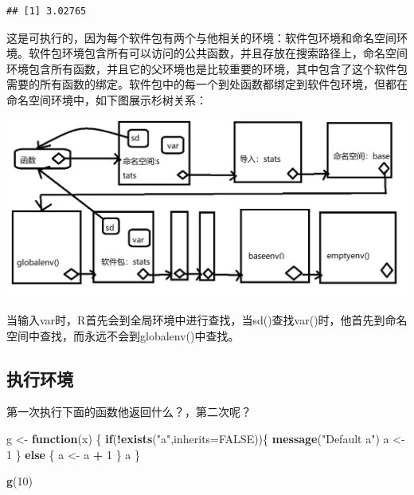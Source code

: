 \documentclass[]{book}
\newenvironment{Shaded}{\begin{snugshade}}{\end{snugshade}}
\newcommand{\KeywordTok}[1]{\textcolor[rgb]{0.13,0.29,0.53}{\textbf{#1}}}
\newcommand{\DataTypeTok}[1]{\textcolor[rgb]{0.13,0.29,0.53}{#1}}
\newcommand{\DecValTok}[1]{\textcolor[rgb]{0.00,0.00,0.81}{#1}}
\newcommand{\StringTok}[1]{\textcolor[rgb]{0.31,0.60,0.02}{#1}}
\newcommand{\OtherTok}[1]{\textcolor[rgb]{0.56,0.35,0.01}{#1}}
\newcommand{\ControlFlowTok}[1]{\textcolor[rgb]{0.13,0.29,0.53}{\textbf{#1}}}
\newcommand{\OperatorTok}[1]{\textcolor[rgb]{0.81,0.36,0.00}{\textbf{#1}}}
\newcommand{\NormalTok}[1]{#1}
\begin{document}
\begin{verbatim}
## [1] 3.02765
\end{verbatim}

这是可执行的，因为每个软件包有两个与他相关的环境：软件包环境和命名空间环境。软件包环境包含所有可以访问的公共函数，并且存放在搜索路径上，命名空间环境包含所有函数，并且它的父环境也是比较重要的环境，其中包含了这个软件包需要的所有函数的绑定。软件包中的每一个到处函数都绑定到软件包环境，但都在命名空间环境中，如下图展示杉树关系：

\begin{center}\includegraphics{img/ch7-9} \end{center}

当输入var时，R首先会到全局环境中进行查找，当sd()查找var()时，他首先到命名空间中查找，而永远不会到globalenv()中查找。

\subsection{执行环境}

第一次执行下面的函数他返回什么？，第二次呢？

\begin{Shaded}
\begin{Highlighting}[]
\NormalTok{g <-}\StringTok{ }\ControlFlowTok{function}\NormalTok{(x) \{}
  \ControlFlowTok{if}\NormalTok{(}\OperatorTok{!}\KeywordTok{exists}\NormalTok{(}\StringTok{"a"}\NormalTok{,}\DataTypeTok{inherits=}\OtherTok{FALSE}\NormalTok{))\{}
    \KeywordTok{message}\NormalTok{(}\StringTok{"Default a"}\NormalTok{)}
\NormalTok{    a <-}\StringTok{ }\DecValTok{1}
\NormalTok{  \} }\ControlFlowTok{else}\NormalTok{ \{}
\NormalTok{    a <-}\StringTok{ }\NormalTok{a }\OperatorTok{+}\StringTok{ }\DecValTok{1}
\NormalTok{  \}}
\NormalTok{  a}
\NormalTok{\}}

\KeywordTok{g}\NormalTok{(}\DecValTok{10}\NormalTok{)}
\end{Highlighting}
\end{Shaded}
\end{document}
